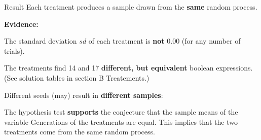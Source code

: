 \begin{frame}
\vspace*{2mm}
\begin{block}{
Result
}
Each treatment produces a sample drawn from the {\bf same} random process.
 
{\bf Evidence:}
 
The standard deviation $sd$ of each treatment is {\bf not} $0.00$
(for any number of trials).
 
The treatments find 14 and 17 {\bf different, but equivalent} boolean expressions.
(See solution tables in section B Treatements.)
 
Different seeds (may) result in {\bf different samples}:
 
The hypothesis test {\bf supports} the conjecture
that the sample means of the variable Generations of the treatments are equal.
This implies that the two treatments come from the same random process.
\end{block}
\end{frame}